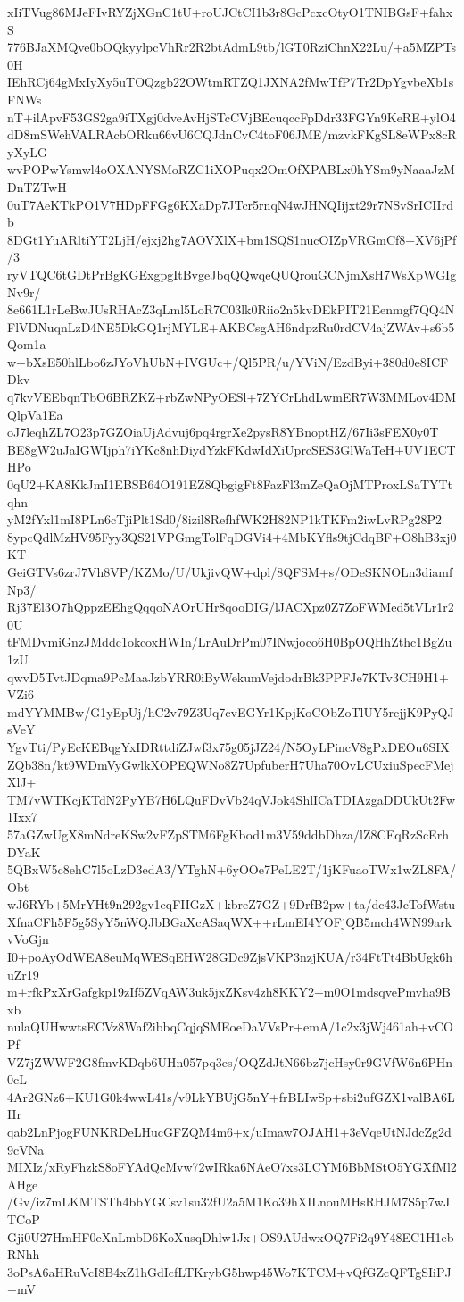 xIiTVug86MJeFIvRYZjXGnC1tU+roUJCtCI1b3r8GcPcxcOtyO1TNIBGsF+fahxS
776BJaXMQve0bOQkyylpcVhRr2R2btAdmL9tb/lGT0RziChnX22Lu/+a5MZPTs0H
IEhRCj64gMxIyXy5uTOQzgb22OWtmRTZQ1JXNA2fMwTfP7Tr2DpYgvbeXb1sFNWs
nT+ilApvF53GS2ga9iTXgj0dveAvHjSTcCVjBEcuqccFpDdr33FGYn9KeRE+ylO4
dD8mSWehVALRAcbORku66vU6CQJdnCvC4toF06JME/mzvkFKgSL8eWPx8cRyXyLG
wvPOPwYsmwl4oOXANYSMoRZC1iXOPuqx2OmOfXPABLx0hYSm9yNaaaJzMDnTZTwH
0uT7AeKTkPO1V7HDpFFGg6KXaDp7JTcr5rnqN4wJHNQIijxt29r7NSvSrICIIrdb
8DGt1YuARltiYT2LjH/ejxj2hg7AOVXlX+bm1SQS1nucOIZpVRGmCf8+XV6jPf/3
ryVTQC6tGDtPrBgKGExgpgItBvgeJbqQQwqeQUQrouGCNjmXsH7WsXpWGIgNv9r/
8e661L1rLeBwJUsRHAcZ3qLml5LoR7C03lk0Riio2n5kvDEkPIT21Eenmgf7QQ4N
FlVDNuqnLzD4NE5DkGQ1rjMYLE+AKBCsgAH6ndpzRu0rdCV4ajZWAv+s6b5Qom1a
w+bXsE50hlLbo6zJYoVhUbN+IVGUc+/Ql5PR/u/YViN/EzdByi+380d0e8ICFDkv
q7kvVEEbqnTbO6BRZKZ+rbZwNPyOESl+7ZYCrLhdLwmER7W3MMLov4DMQlpVa1Ea
oJ7leqhZL7O23p7GZOiaUjAdvuj6pq4rgrXe2pysR8YBnoptHZ/67Ii3sFEX0y0T
BE8gW2uJaIGWIjph7iYKc8nhDiydYzkFKdwIdXiUprcSES3GlWaTeH+UV1ECTHPo
0qU2+KA8KkJmI1EBSB64O191EZ8QbgigFt8FazFl3mZeQaOjMTProxLSaTYTtqhn
yM2fYxl1mI8PLn6cTjiPlt1Sd0/8izil8RefhfWK2H82NP1kTKFm2iwLvRPg28P2
8ypcQdlMzHV95Fyy3QS21VPGmgTolFqDGVi4+4MbKYfls9tjCdqBF+O8hB3xj0KT
GeiGTVs6zrJ7Vh8VP/KZMo/U/UkjivQW+dpl/8QFSM+s/ODeSKNOLn3diamfNp3/
Rj37El3O7hQppzEEhgQqqoNAOrUHr8qooDIG/lJACXpz0Z7ZoFWMed5tVLr1r20U
tFMDvmiGnzJMddc1okcoxHWIn/LrAuDrPm07INwjoco6H0BpOQHhZthc1BgZu1zU
qwvD5TvtJDqma9PcMaaJzbYRR0iByWekumVejdodrBk3PPFJe7KTv3CH9H1+VZi6
mdYYMMBw/G1yEpUj/hC2v79Z3Uq7cvEGYr1KpjKoCObZoTlUY5rcjjK9PyQJsVeY
YgvTti/PyEcKEBqgYxIDRttdiZJwf3x75g05jJZ24/N5OyLPincV8gPxDEOu6SIX
ZQb38n/kt9WDmVyGwlkXOPEQWNo8Z7UpfuberH7Uha70OvLCUxiuSpecFMejXlJ+
TM7vWTKcjKTdN2PyYB7H6LQuFDvVb24qVJok4ShlICaTDIAzgaDDUkUt2Fw1Ixx7
57aGZwUgX8mNdreKSw2vFZpSTM6FgKbod1m3V59ddbDhza/lZ8CEqRzScErhDYaK
5QBxW5c8ehC7l5oLzD3edA3/YTghN+6yOOe7PeLE2T/1jKFuaoTWx1wZL8FA/Obt
wJ6RYb+5MrYHt9n292gv1eqFIIGzX+kbreZ7GZ+9DrfB2pw+ta/dc43JcTofWstu
XfnaCFh5F5g5SyY5nWQJbBGaXcASaqWX++rLmEI4YOFjQB5mch4WN99arkvVoGjn
I0+poAyOdWEA8euMqWESqEHW28GDc9ZjsVKP3nzjKUA/r34FtTt4BbUgk6huZr19
m+rfkPxXrGafgkp19zIf5ZVqAW3uk5jxZKsv4zh8KKY2+m0O1mdsqvePmvha9Bxb
nulaQUHwwtsECVz8Waf2ibbqCqjqSMEoeDaVVsPr+emA/1c2x3jWj461ah+vCOPf
VZ7jZWWF2G8fmvKDqb6UHn057pq3es/OQZdJtN66bz7jcHsy0r9GVfW6n6PHn0cL
4Ar2GNz6+KU1G0k4wwL41s/v9LkYBUjG5nY+frBLIwSp+sbi2ufGZX1valBA6LHr
qab2LnPjogFUNKRDeLHucGFZQM4m6+x/uImaw7OJAH1+3eVqeUtNJdcZg2d9cVNa
MIXIz/xRyFhzkS8oFYAdQcMvw72wIRka6NAeO7xs3LCYM6BbMStO5YGXfMl2AHge
/Gv/iz7mLKMTSTh4bbYGCsv1su32fU2a5M1Ko39hXILnouMHsRHJM7S5p7wJTCoP
Gji0U27HmHF0eXnLmbD6KoXusqDhlw1Jx+OS9AUdwxOQ7Fi2q9Y48EC1H1ebRNhh
3oPsA6aHRuVcI8B4xZ1hGdIcfLTKrybG5hwp45Wo7KTCM+vQfGZcQFTgSIiPJ+mV
